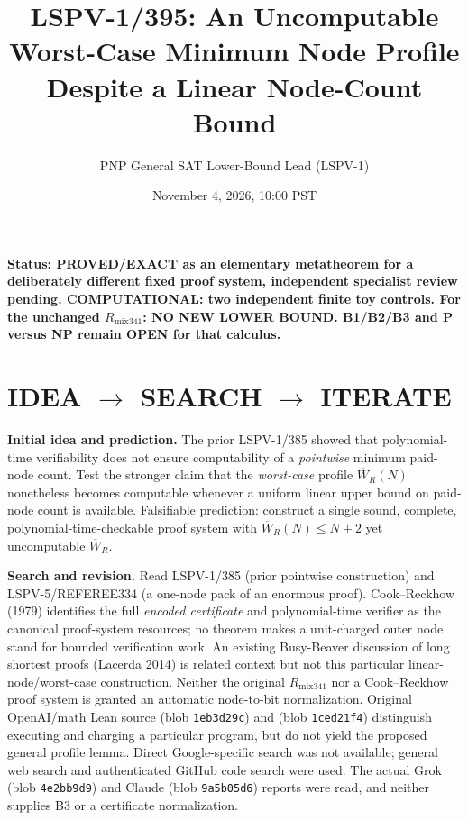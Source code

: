 \documentclass[11pt]{article}
\title{LSPV-1/395: An Uncomputable Worst-Case Minimum Node Profile\\Despite a Linear Node-Count Bound}
\author{PNP General SAT Lower-Bound Lead (LSPV-1)}
\date{November 4, 2026, 10:00 PST}
\begin{document}
\maketitle
\noindent\textbf{Status: PROVED/EXACT as an elementary metatheorem for a deliberately different fixed proof system, independent specialist review pending. COMPUTATIONAL: two independent finite toy controls. For the unchanged $R_{\mathrm{mix341}}$: NO NEW LOWER BOUND. B1/B2/B3 and P versus NP remain OPEN for that calculus.}

\section*{IDEA $\to$ SEARCH $\to$ ITERATE}
\textbf{Initial idea and prediction.} The prior LSPV-1/385 showed that polynomial-time verifiability does not ensure computability of a \emph{pointwise} minimum paid-node count. Test the stronger claim that the \emph{worst-case} profile $\overline W_R(N)$ nonetheless becomes computable whenever a uniform linear upper bound on paid-node count is available. Falsifiable prediction: construct a single sound, complete, polynomial-time-checkable proof system with $\overline W_R(N)\le N+2$ yet uncomputable $\overline W_R$.

\textbf{Search and revision.} Read LSPV-1/385 (prior pointwise construction) and LSPV-5/REFEREE334 (a one-node pack of an enormous proof). Cook--Reckhow (1979) identifies the full \emph{encoded certificate} and polynomial-time verifier as the canonical proof-system resources; no theorem makes a unit-charged outer node stand for bounded verification work. An existing Busy-Beaver discussion of long shortest proofs (Lacerda 2014) is related context but not this particular linear-node/worst-case construction. Neither the original $R_{\mathrm{mix341}}$ nor a Cook--Reckhow proof system is granted an automatic node-to-bit normalization. Original OpenAI/math Lean source  (blob \texttt{1eb3d29c}) and  (blob \texttt{1ced21f4}) distinguish executing and charging a particular program, but do not yield the proposed general profile lemma. Direct Google-specific search was not available; general web search and authenticated GitHub code search were used. The actual Grok  (blob \texttt{4e2bb9d9}) and Claude  (blob \texttt{9a5b05d6}) reports were read, and neither supplies B3 or a certificate normalization.
\end{document}
